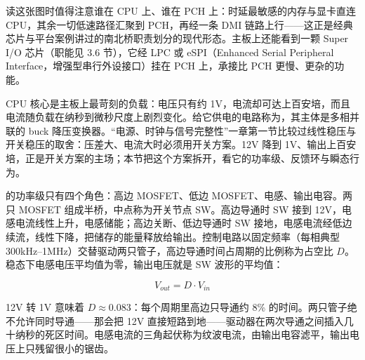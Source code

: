 读这张图时值得注意谁在 CPU 上、谁在 PCH 上：时延最敏感的内存与显卡直连 CPU，其余一切低速路径汇聚到 PCH，再经一条 DMI 链路上行——这正是经典芯片与平台案例讲过的南北桥职责划分的现代形态。主板上还能看到一颗 Super I/O 芯片（职能见 3.6 节），它经 LPC 或 eSPI（Enhanced Serial Peripheral Interface，增强型串行外设接口）挂在 PCH 上，承接比 PCH 更慢、更杂的功能。


CPU 核心是主板上最苛刻的负载：电压只有约 1V，电流却可达上百安培，而且电流随负载在纳秒到微秒尺度上剧烈变化。给它供电的电路称为，其主体是多相并联的 buck 降压变换器。“电源、时钟与信号完整性”一章第一节比较过线性稳压与开关稳压的取舍：压差大、电流大时必须用开关方案。12V 降到 1V、输出上百安培，正是开关方案的主场；本节把这个方案拆开，看它的功率级、反馈环与瞬态行为。


的功率级只有四个角色：高边 MOSFET、低边 MOSFET、电感、输出电容。两只 MOSFET 组成半桥，中点称为开关节点 SW。高边导通时 SW 接到 12V，电感电流线性上升，电感储能；高边关断、低边导通时 SW 接地，电感电流经低边续流，线性下降，把储存的能量释放给输出。控制电路以固定频率（每相典型 300kHz--1MHz）交替驱动两只管子，高边导通时间占周期的比例称为占空比 $D$。稳态下电感电压平均值为零，输出电压就是 SW 波形的平均值：

$$V_{out} = D \cdot V_{in}$$

12V 转 1V 意味着 $D \approx 0.083$：每个周期里高边只导通约 8\% 的时间。两只管子绝不允许同时导通——那会把 12V 直接短路到地——驱动器在两次导通之间插入几十纳秒的死区时间。电感电流的三角起伏称为纹波电流，由输出电容滤平，输出电压上只残留很小的锯齿。

